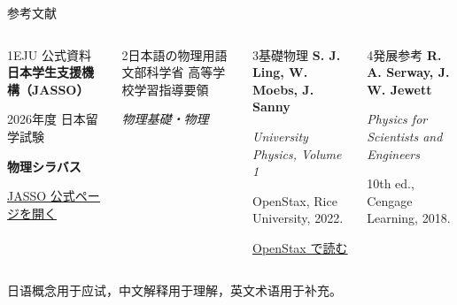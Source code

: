 \documentclass[notheorems,aspectratio=169]{beamer}
\newcommand{\jp}[1]{\textbf{\color{JapanBlue}#1}}
\begin{document}
\begin{frame}{参考文献}
  \small
  \begin{columns}[T,onlytextwidth]
    \begin{block}{1\quad EJU 公式資料}
      \textbf{日本学生支援機構（JASSO）}\par
      \vspace{0.2em}
      2026年度 日本留学試験\par
      \jp{物理シラバス}\par
      \vspace{0.3em}
      {\scriptsize
      \href{https://www.jasso.go.jp/ryugaku/eju/examinee/syllabus/science_phy.html}
      {\color{JapanBlue}\underline{JASSO 公式ページを開く}}}
    \end{block}
    \begin{alertblock}{2\quad 日本語の物理用語}
      文部科学省 高等学校学習指導要領\par
      \emph{物理基礎・物理}
    \end{alertblock}

    \begin{block}{3\quad 基礎物理}
      \textbf{S. J. Ling, W. Moebs, J. Sanny}\par
      \emph{University Physics, Volume 1}\par
      OpenStax, Rice University, 2022.\par
      \vspace{0.3em}
      {\scriptsize
      \href{https://openstax.org/details/books/university-physics-volume-1}
      {\color{JapanBlue}\underline{OpenStax で読む}}}
    \end{block}
    \begin{alertblock}{4\quad 発展参考}
      \textbf{R. A. Serway, J. W. Jewett}\par
      \emph{Physics for Scientists and Engineers}\par
      10th ed., Cengage Learning, 2018.
    \end{alertblock}
  \end{columns}
  \vfill
  \centering
  {\footnotesize 日语概念用于应试，中文解释用于理解，英文术语用于补充。}
\end{frame}
\end{document}
